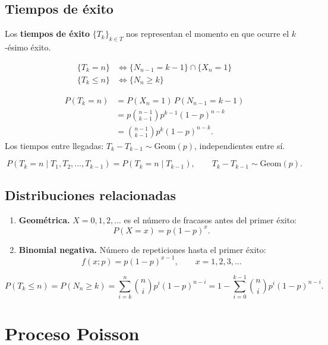 \subsection{Tiempos de éxito}

\begin{defi}{}{}
Los \textbf{tiempos de éxito} $\{T_k\}_{k\in T}$ nos representan el momento en que ocurre el $k$-ésimo éxito.
\end{defi}

\begin{align*}
    \{T_k=n\} &\Leftrightarrow \{N_{n-1}=k-1\}\cap\{X_n=1\}\\
    \{T_k\leq n\} &\Leftrightarrow \{N_n\geq k\}
\end{align*}

\begin{teo}{}{}
\begin{align*}
P(T_k=n) &= P(X_n=1)\,P(N_{n-1}=k-1) \\
           &= p\binom{n-1}{k-1}p^{k-1}(1-p)^{n-k} \\
           &= \binom{n-1}{k-1}p^k(1-p)^{n-k}.
\end{align*}
Los tiempos entre llegadas: $T_k-T_{k-1}\sim\mathrm{Geom}(p)$, independientes entre sí.
\end{teo}

\begin{teo}{}{}
\[
P(T_k=n\mid T_1,T_2,\dots,T_{k-1})=P(T_k=n\mid T_{k-1}),\qquad
T_k-T_{k-1}\sim\mathrm{Geom}(p).
\]
\end{teo}

\subsection{Distribuciones relacionadas}

\begin{enumerate}[label=\alph*)]
    \item \textbf{Geométrica.} $X=0,1,2,\dots$ es el número de fracasos antes del primer éxito:
    \[P(X=x)=p(1-p)^x.\]

    \item \textbf{Binomial negativa.} Número de repeticiones hasta el primer éxito:
    \[f(x;p)=p(1-p)^{x-1},\qquad x=1,2,3,\dots\]
\end{enumerate}

\[
P(T_k\leq n)=P(N_n\geq k)=\sum_{i=k}^{n}\binom{n}{i}p^i(1-p)^{n-i}
=1-\sum_{i=0}^{k-1}\binom{n}{i}p^i(1-p)^{n-i}.
\]

\section{Proceso Poisson}

